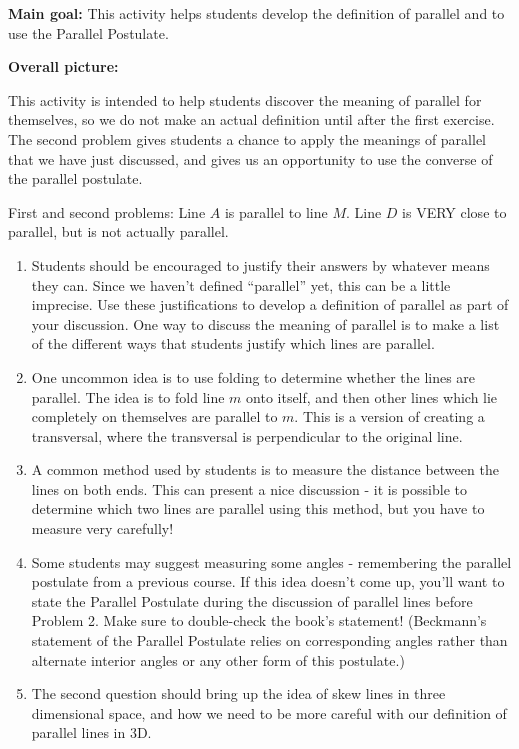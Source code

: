 \documentclass[nooutcomes,noauthor]{ximera}
\begin{document}
\begin{instructorNotes}

{\bf Main goal:} This activity helps students develop the definition of parallel and to use the Parallel Postulate.

{\bf Overall picture:}

This activity is intended to help students discover the meaning of parallel for themselves, so we do not make an actual definition until after the first exercise.  The second problem gives students a chance to apply the meanings of parallel that we have just discussed, and gives us an opportunity to use the converse of the parallel postulate.

First and second problems: Line $A$ is parallel to line $M$.  Line $D$ is VERY close to parallel, but is not actually parallel.
\begin{enumerate}
\item Students should be encouraged to justify their answers by whatever means they can.  Since we haven't defined ``parallel'' yet, this can be a little imprecise. Use these justifications to develop a definition of parallel as part of your discussion.  One way to discuss the meaning of parallel is to make a list of the different ways that students justify which lines are parallel.
\item One uncommon idea is to use folding to determine whether the lines are parallel. The idea is to fold line $m$ onto itself, and then other lines which lie completely on themselves are parallel to $m$. This is a version of creating a transversal, where the transversal is perpendicular to the original line.
\item A common method used by students is to measure the distance between the lines on both ends.  This can present a nice discussion - it is possible to determine which two lines are parallel using this method, but you have to measure very carefully!
\item Some students may suggest measuring some angles - remembering the parallel postulate from a previous course.  If this idea doesn't come up, you'll want to state the Parallel Postulate during the discussion of parallel lines before Problem 2.  Make sure to double-check the book's statement!  (Beckmann's statement of the Parallel Postulate relies on corresponding angles rather than alternate interior angles or any other form of this postulate.)  
\item The second question should bring up the idea of skew lines in three dimensional space, and how we need to be more careful with our definition of parallel lines in 3D.
\end{enumerate}


\end{instructorNotes}
\end{document}
